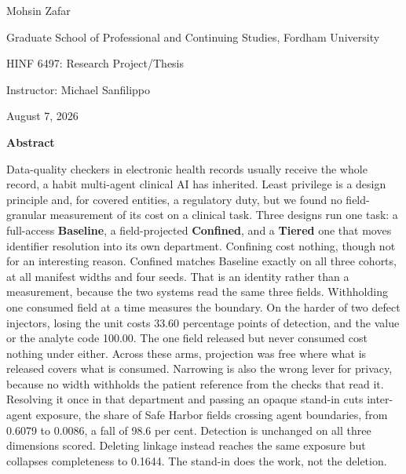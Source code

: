 \thispagestyle{fancy}
\begin{center}
\vspace*{3\baselineskip}

\textbf{\papertitle}

\vspace{\baselineskip}

Mohsin Zafar

Graduate School of Professional and Continuing Studies, Fordham University

HINF 6497: Research Project/Thesis

Instructor: Michael Sanfilippo

August 7, 2026
\end{center}

\newpage

{\centering\normalfont\bfseries\large Abstract\par}
\nopagebreak
\noindent
Data-quality checkers in electronic health records usually receive the whole record, a habit
multi-agent clinical AI has inherited. Least privilege is a design principle and, for covered
entities, a regulatory duty, but we found no field-granular measurement of its cost on a clinical
task. Three designs run one task: a full-access \textbf{Baseline}, a field-projected
\textbf{Confined}, and a \textbf{Tiered} one that moves identifier resolution into its own
department. Confining cost nothing, though not for an interesting reason. Confined matches Baseline
exactly on all three cohorts, at all manifest widths and four seeds. That is an identity rather than
a measurement, because the two systems read the same three fields. Withholding one consumed field at
a time measures the boundary. On the harder of two defect injectors, losing the unit costs 33.60
percentage points of detection, and the value or the analyte code 100.00. The one field released but
never consumed cost nothing under either. Across these arms, projection was free where what is
released covers what is consumed. Narrowing is also the wrong lever for privacy, because no width
withholds the patient reference from the checks that read it. Resolving it once in that department
and passing an opaque stand-in cuts inter-agent exposure, the share of Safe Harbor fields crossing
agent boundaries, from 0.6079 to 0.0086, a fall of 98.6 per cent. Detection is unchanged on all three
dimensions scored. Deleting linkage instead reaches the same exposure but collapses completeness to
0.1644. The stand-in does the work, not the deletion.

\newpage
\setcounter{tocdepth}{2}
\begingroup
{}
\tableofcontents
\endgroup
\newpage
